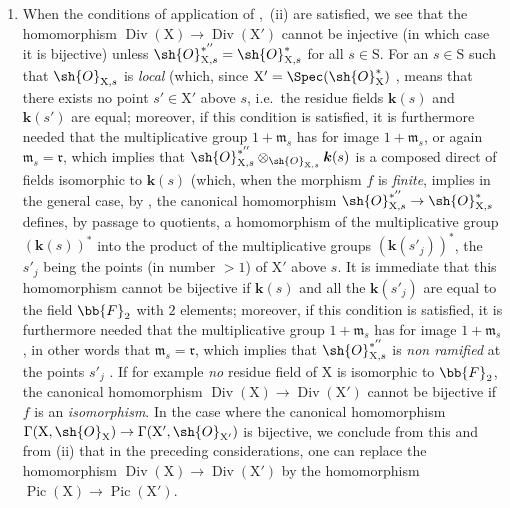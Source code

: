 \begin{remark}[21.8.6]
\begin{enumerate}[label=(\roman*)]
  \item When the conditions of application of ,{}~(ii) are satisfied, we see that the homomorphism $\operatorname{Div}(\mathrm{X})\to\operatorname{Div}(\mathrm{X}')$ cannot be injective (in which case it is bijective) unless $\sh{O}^{*''}_{\mathrm{X},s}=\sh{O}^*_{\mathrm{X},s}$ for all $s\in\mathrm{S}$.
For an $s\in\mathrm{S}$ such that $\sh{O}_{\mathrm{X},s}$ is \emph{local} (which, since $\mathrm{X}'=\Spec(\sh{O}^*_\mathrm{X})$ , means that there exists no point $s'\in\mathrm{X}'$ above $s$, i.e.\ the residue fields $\boldsymbol{k}(s)$ and $\boldsymbol{k}(s')$ are equal;
moreover, if this condition is satisfied, it is furthermore needed that the multiplicative group $1+\mathfrak{m}_s$ has for image $1+\mathfrak{m}_s$, or again $\mathfrak{m}_s=\mathfrak{r}$, which implies that $\sh{O}^{*''}_{\mathrm{X},s}\otimes_{\sh{O}_{\mathrm{X},s}}\boldsymbol{k}(s)$ is a composed direct of fields isomorphic to $\boldsymbol{k}(s)$ (which, when the morphism $f$ is \emph{finite}, implies in the general case, by , the canonical homomorphism $\sh{O}^{*''}_{\mathrm{X},s}\to\sh{O}^*_{\mathrm{X},s}$ defines, by passage to quotients, a homomorphism of the multiplicative group $(\boldsymbol{k}(s))^*$ into the product of the multiplicative groups $(\boldsymbol{k}(s'_j))^*$, the $s'_j$ being the points (in
number $>1$) of $\mathrm{X}'$ above $s$.
It is immediate that this homomorphism cannot be bijective if $\boldsymbol{k}(s)$ and all the $\boldsymbol{k}(s'_j)$ are equal to the field $\bb{F}_2$ with $2$ elements;
moreover, if this condition is satisfied, it is furthermore needed that the multiplicative group $1+\mathfrak{m}_s$ has for image $1+\mathfrak{m}_s$, in other words that $\mathfrak{m}_s=\mathfrak{r}$, which implies that $\sh{O}^{*''}_{\mathrm{X},s}$ is \emph{non ramified} at the points $s'_j$ .
If for example \emph{no} residue field of $\mathrm{X}$ is isomorphic to $\bb{F}_2$, the canonical homomorphism $\operatorname{Div}(\mathrm{X})\to\operatorname{Div}(\mathrm{X}')$ cannot be bijective if $f$ is an \emph{isomorphism}.
In the case where the canonical homomorphism $\Gamma(\mathrm{X},\sh{O}_\mathrm{X})\to\Gamma(\mathrm{X}',\sh{O}_{\mathrm{X}'})$ is bijective, we conclude from this and from (ii) that in the preceding considerations, one can replace the homomorphism $\operatorname{Div}(\mathrm{X})\to\operatorname{Div}(\mathrm{X}')$ by the homomorphism $\operatorname{Pic}(\mathrm{X})\to\operatorname{Pic}(\mathrm{X}')$.
\end{enumerate}
\end{remark}



